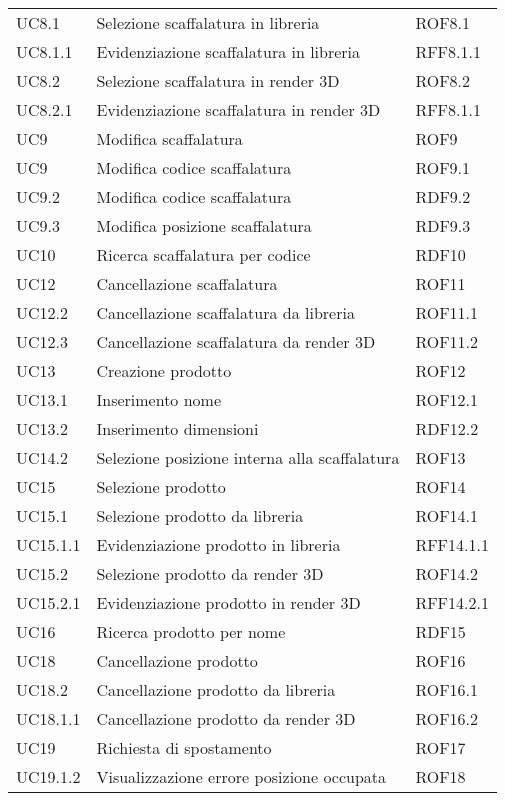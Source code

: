 \begin{xltabular}{\textwidth}{ p{0.3\textwidth} | X | p{0.2\textwidth} }
    UC8.1 & Selezione scaffalatura in libreria & ROF8.1\\
    UC8.1.1 & Evidenziazione scaffalatura in libreria & RFF8.1.1\\
    UC8.2 & Selezione scaffalatura in render 3D & ROF8.2\\
    UC8.2.1 & Evidenziazione scaffalatura in render 3D & RFF8.1.1\\
    UC9 & Modifica scaffalatura & ROF9\\
    UC9 & Modifica codice scaffalatura & ROF9.1\\
    UC9.2 &  Modifica codice scaffalatura & RDF9.2\\
    UC9.3 & Modifica posizione scaffalatura & RDF9.3\\
    UC10 & Ricerca scaffalatura per codice & RDF10\\
    UC12 & Cancellazione scaffalatura & ROF11\\
    UC12.2 &  Cancellazione scaffalatura da libreria & ROF11.1\\
    UC12.3 & Cancellazione scaffalatura da render 3D & ROF11.2\\
    UC13 & Creazione prodotto & ROF12\\
    UC13.1 & Inserimento nome & ROF12.1\\
    UC13.2 &  Inserimento dimensioni & RDF12.2\\    
    UC14.2 & Selezione posizione interna alla scaffalatura & ROF13\\
    UC15 & Selezione prodotto & ROF14\\
    UC15.1 &  Selezione prodotto da libreria & ROF14.1\\
    UC15.1.1 & Evidenziazione prodotto in libreria & RFF14.1.1\\
    UC15.2 & Selezione prodotto da render 3D & ROF14.2\\
    UC15.2.1 & Evidenziazione prodotto in render 3D & RFF14.2.1\\
    UC16 & Ricerca prodotto per nome & RDF15\\
    UC18 & Cancellazione prodotto & ROF16\\
    UC18.2 & Cancellazione prodotto da libreria & ROF16.1\\
    UC18.1.1 & Cancellazione prodotto da render 3D & ROF16.2\\
    UC19 & Richiesta di spostamento & ROF17\\
    UC19.1.2 & Visualizzazione errore posizione occupata & ROF18\\

    \hline
\end{xltabular}



